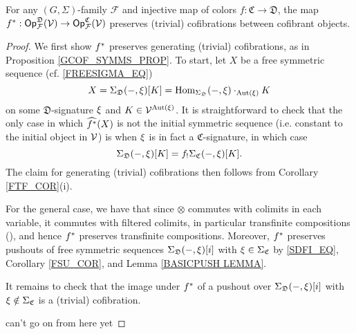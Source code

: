 \documentclass[a4paper,10pt
,draft
]{article}%
\renewcommand{\F}{\mathcal F}
\renewcommand{\1}{\eta}%
\begin{document}
{\color{OliveGreen} %
  \begin{corollary}
        For any $(G, \Sigma)$-family $\F$ and injective map of colors $f \colon \mathfrak C \to \mathfrak D$,
        the map $f^{\**}: \Op^{\mathfrak D}_\F(\V) \to \Op^{\mathfrak C}_\F(\V)$ preserves (trivial) cofibrations between cofibrant objects.
  \end{corollary}
  \begin{proof}
        We first show $f^{\**}$ preserves generating (trivial) cofibrations, as in Proposition \ref{GCOF_SYMMS_PROP}.
        To start, let $X$ be a free symmetric sequence (cf. \eqref{FREESIGMA_EQ})
        \[
              X = \Sigma_{\mathfrak D}(-, \xi)[K] = \operatorname{Hom}_{\Sigma_{\mathfrak D}}(-,\xi) \cdot_{\operatorname{Aut}(\xi)} K
        \]
        on some $\mathfrak D$-signature $\xi$ and $K \in \mathcal V^{\operatorname{Aut}(\xi)}$.
        It is straightforward to check that the only case in which $\widehat{f^{\**}}(X)$ is not the initial symmetric sequence (i.e. constant to the initial object in $\mathcal V$)
        is when $\xi$ is in fact a $\mathfrak C$-signature, in which case
        \begin{equation}
              \label{SDFI_EQ}
              \Sigma_{\mathfrak D}(-,\xi)[K] = f_!\Sigma_{\mathfrak C}(-,\xi)[K].
        \end{equation}
        The claim for generating (trivial) cofibrations then follows from Corollary \ref{FTF_COR}(i).

        For the general case, we have that since $\otimes$ commutes with colimits in each variable, it commutes with filtered colimits, in particular transfinite compositions (\cite[Lemma 2.3.3]{Rez96}), and hence $f^{\**}$ preserves transfinite compositions.
        Moreover, $f^{\**}$ preserves pushouts of free symmetric sequences
        $\Sigma_{\mathfrak D}(-,\xi)[i]$
        with $\xi \in \Sigma_{\mathfrak C}$ by \eqref{SDFI_EQ}, Corollary \ref{FSU_COR}, and Lemma \ref{BASICPUSH LEMMA}.

        It remains to check that the image under $f^{\**}$ of a pushout over $\Sigma_{\mathfrak D}(-,\xi)[i]$ with $\xi \notin \Sigma_{\mathfrak C}$ is a (trivial) cofibration.
        
        {\color{red} can't go on from here yet}
  \end{proof}

}
\end{document}
